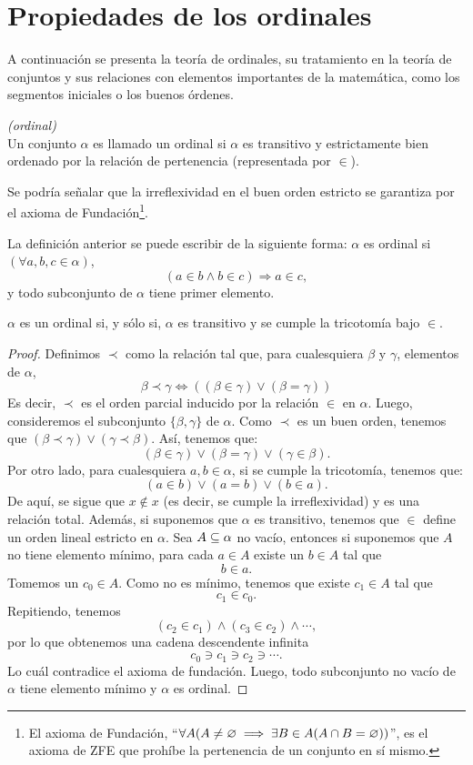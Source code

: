 \section{Propiedades de los ordinales}
\label{sec11}
A continuación se presenta la teoría de ordinales, su tratamiento en la teoría de conjuntos y sus relaciones con elementos importantes de la matemática, como los segmentos iniciales o los buenos órdenes. 
\begin{defn}\label{d1} \textit{(ordinal)}\\
Un conjunto $\alpha$ es llamado un ordinal si $\alpha$ es transitivo y estrictamente bien ordenado por la relación de pertenencia (representada por $\in$).
\end{defn}
\begin{obs}
    Se podría señalar que la irreflexividad en el buen orden estricto se garantiza por el axioma de Fundación\footnote{El axioma de Fundación, ``$\forall A(A\neq\varnothing\implies\exists B\in A(A\cap B=\varnothing))$'', es el axioma de ZFE que prohíbe la pertenencia de un conjunto en sí mismo.}.
\end{obs}

La definición anterior se puede escribir de la siguiente forma:
$\alpha$ es ordinal si $(\forall a,b,c\in\alpha)$,
\[(a\in b\land b\in c)\Longrightarrow a\in c,\]
y todo subconjunto de $\alpha$ tiene primer elemento. 

\begin{thm}\label{t1}
    $\alpha$ es un ordinal si, y sólo si, $\alpha$ es transitivo y se cumple la tricotomía bajo $\in$.
\end{thm}
\begin{proof}
Definimos $\prec$ como la relación tal que, para cualesquiera $\beta$ y $\gamma$, elementos de $\alpha$,
\[\beta\prec\gamma\Longleftrightarrow ((\beta\in\gamma)\lor(\beta=\gamma))\]
Es decir, $\prec$ es el orden parcial inducido por la relación $\in$ en $\alpha$. Luego, consideremos el subconjunto $\{\beta,\gamma\}$ de $\alpha$. Como $\prec$ es un buen orden, tenemos que $(\beta\prec\gamma)\lor(\gamma\prec\beta)$. Así, tenemos que:
\[(\beta\in\gamma)\lor(\beta=\gamma)\lor(\gamma\in\beta).\]
Por otro lado, para cualesquiera $a,b\in\alpha$, si se cumple la tricotomía, tenemos que:
\[(a\in b)\lor (a=b)\lor (b\in a).\]
De aquí, se sigue que $x\not\in x$ (es decir, se cumple la irreflexividad) y es una relación total. Además, si suponemos que $\alpha$ es transitivo, tenemos que $\in$ define un orden lineal estricto en $\alpha$.
Sea $A\subseteq \alpha$ no vacío, entonces si suponemos que $A$ no tiene elemento mínimo, para cada $a\in A$ existe un $b\in A$ tal que
\[b\in a.\]
Tomemos un $c_0\in A$. Como no es mínimo, tenemos que existe $c_1\in A$ tal que
\[c_1\in c_0.\]
Repitiendo, tenemos
\[(c_2\in c_1)\land (c_3\in c_2)\land \cdots,\]
por lo que obtenemos una cadena descendente infinita
\[c_0\ni c_1\ni c_2\ni\cdots.\]
Lo cuál contradice el axioma de fundación.
Luego, todo subconjunto no vacío de $\alpha$ tiene elemento mínimo y $\alpha$ es ordinal.
\end{proof}

